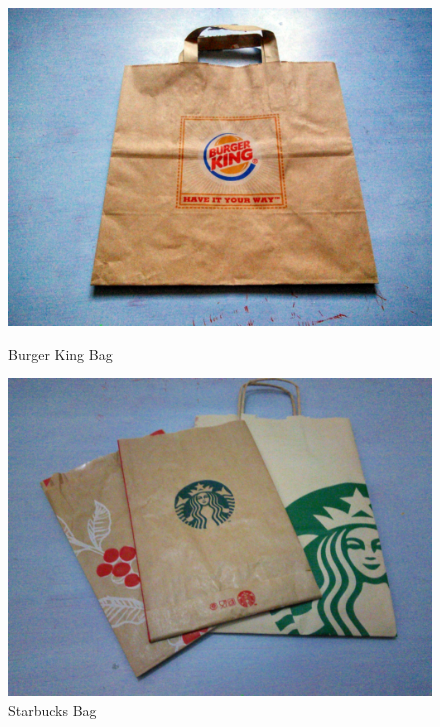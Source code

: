 \begin{figure}[!tbp]
  \centering
  \begin{minipage}[b]{0.48\textwidth}
    \includegraphics[width=\textwidth]{project_graphics/collected_burgerking.jpg}
    \caption{Burger King Bag}
    \label{fig:BurgerKingBag}
  \end{minipage}
  \hfill
  \begin{minipage}[b]{0.48\textwidth}
    \includegraphics[width=\textwidth]{project_graphics/collected_starbucks.jpg}
    \caption{Starbucks Bag}
    \label{fig:StarbucksBag}
  \end{minipage}
\end{figure}


